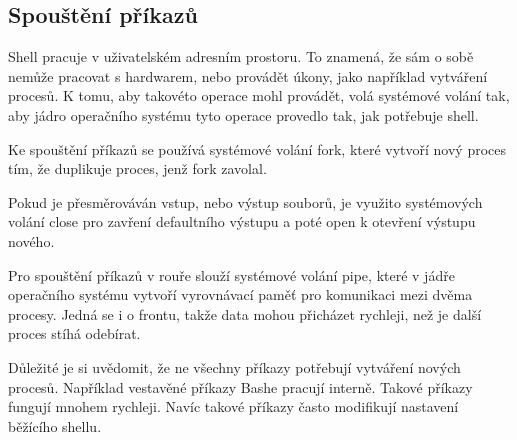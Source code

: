 \documentclass[thesis=M,czech]{FITthesis}[2012/06/26]
\begin{document}


%
%
%
\subsection{Spouštění příkazů}\label{sec:exec}

Shell pracuje v uživatelském adresním prostoru. To znamená, že sám o sobě nemůže pracovat s hardwarem, nebo provádět úkony, jako například vytváření procesů. K tomu, aby takovéto operace mohl provádět, volá systémové volání tak, aby jádro operačního systému tyto operace provedlo tak, jak potřebuje shell.

Ke spouštění příkazů se používá systémové volání fork, které vytvoří nový proces tím, že duplikuje proces, jenž fork zavolal.

Pokud je přesměrováván vstup, nebo výstup souborů, je využito systémových volání close pro zavření defaultního výstupu a poté open k otevření výstupu nového.

Pro spouštění příkazů v rouře slouží systémové volání pipe, které v jádře operačního systému vytvoří vyrovnávací paměť pro komunikaci mezi dvěma procesy. Jedná se i o frontu, takže data mohou přicházet rychleji, než je další proces stíhá odebírat.

Důležité je si uvědomit, že ne všechny příkazy potřebují vytváření nových procesů. Například vestavěné příkazy Bashe pracují interně. Takové příkazy fungují mnohem rychleji. Navíc takové příkazy často modifikují nastavení běžícího shellu.





\end{document}
